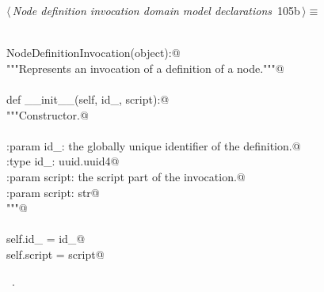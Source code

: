\documentclass[
    a4paper,      %
    10pt,         %
    openright,    %
    notitlepage,  %
    parskip=half, %
]{scrreprt}       %
\theoremstyle{definition}                    %
\begin{document}
\begin{flushleft}
\begin{minipage}{\linewidth}
\begin{list}{}{\setlength{\itemsep}{-\parsep}\setlength{\itemindent}{-\leftmargin}}
\item{}
\end{list}
\end{minipage}\vspace{4ex}
\end{flushleft}
\begin{flushleft} \small
\begin{minipage}{\linewidth}\label{scrap172}\raggedright\small
{} $\langle\,${\itshape Node definition invocation domain model declarations}\nobreak\ {\footnotesize {105b}}$\,\rangle\equiv$
\vspace{-1exm}
\begin{list}{}{} \item
\mbox{}\lstinline@@\\
\mbox{}\lstinline@class NodeDefinitionInvocation(object):@\\
\mbox{}\lstinline@    """Represents an invocation of a definition of a node."""@\\
\mbox{}\lstinline@@\\
\mbox{}\lstinline@    def __init__(self, id_, script):@\\
\mbox{}\lstinline@        """Constructor.@\\
\mbox{}\lstinline@@\\
\mbox{}\lstinline@        :param id_: the globally unique identifier of the definition.@\\
\mbox{}\lstinline@        :type  id_: uuid.uuid4@\\
\mbox{}\lstinline@        :param script: the script part of the invocation.@\\
\mbox{}\lstinline@        :param script: str@\\
\mbox{}\lstinline@        """@\\
\mbox{}\lstinline@@\\
\mbox{}\lstinline@        self.id_ = id_@\\
\mbox{}\lstinline@        self.script = script@{\NWsep}
\end{list}
\vspace{-1.5ex}
\footnotesize
\begin{list}{}{\setlength{\itemsep}{-\parsep}\setlength{\itemindent}{-\leftmargin}}
\item \NWtxtMacroRefIn\ .

\item{}
\end{list}
\end{minipage}\vspace{4ex}
\end{flushleft}
\end{document}
